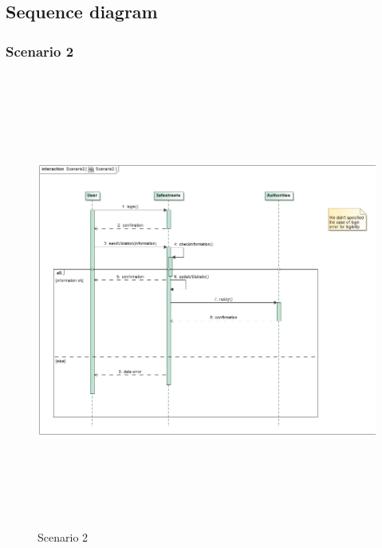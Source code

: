 \subsection{Sequence diagram}
\subsubsection{Scenario 2}
	\begin{figure}[H]
	\begin{minipage}[b]{0.40\textwidth}
		\includegraphics[width=18cm,height=15cm]{Images/SequenceRASD/Scenario2.png}
		\caption{Scenario 2}
	\end{minipage}
\end{figure}
\newpage

